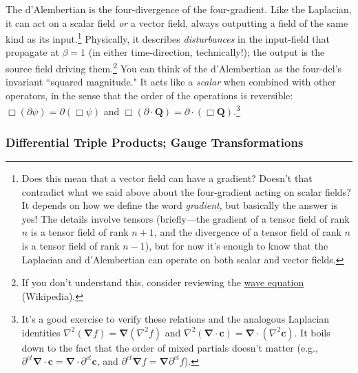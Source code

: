 \documentclass[12pt]{article}
\renewcommand{\vv}[1]{\mathbf{#1}}
\newcommand{\del}{\boldsymbol{\nabla}}
\begin{document}
The d'Alembertian is the four-divergence of the four-gradient. Like the Laplacian, it can act on a scalar field \emph{or} a vector field, always outputting a field of the same kind as its input.\footnote{\label{fn:gd}Does this mean that a vector field can have a gradient? Doesn't that contradict what we said above about the four-gradient acting on scalar fields? It depends on how we define the word \emph{gradient}, but basically the answer is yes! The details involve tensors (briefly---the gradient of a tensor field of rank $n$ is a tensor field of rank $n + 1$, and the divergence of a tensor field of rank $n$ is a tensor field of rank $n - 1$), but for now it's enough to know that the Laplacian and d'Alembertian can operate on both scalar and vector fields.} Physically, it describes \emph{disturbances} in the input-field that propagate at $\beta = 1$ (in either time-direction, technically!); the output is the source field driving them.\footnote{If you don't understand this, consider reviewing the \href{https://en.wikipedia.org/wiki/Wave_equation}{wave equation} (Wikipedia).} You can think of the d'Alembertian as the four-del's invariant ``squared magnitude." It acts like a \emph{scalar} when combined with other operators, in the sense that the order of the operations is reversible: $\Box (\partialup \psi) = \partialup (\Box \psi)$ and $\Box (\partialup \cdot \vv Q) = \partialup \cdot (\Box \vv Q)$.\footnote{It's a good exercise to verify these relations and the analogous Laplacian identities $\nabla ^2 (\del f) = \del (\nabla ^2 f)$ and $\nabla ^2 (\del \cdot \vv c) = \del \cdot (\nabla ^2 \vv c)$. It boils down to the fact that the order of mixed partials doesn't matter (e.g., $\partial^{ct} \del \cdot \vv c = \del \cdot \partial^{ct} \vv c$, and $\partial^{ct} \del f = \del \partial^{ct} f$).}

\subsubsection{Differential Triple Products; Gauge Transformations}\label{sssec:tp}
\end{document}
